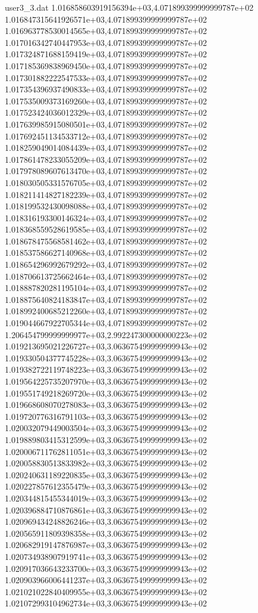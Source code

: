 \begin{filecontents}{user3_3.dat}
1.016858603919156394e+03,4.071899399999999787e+02
1.016847315641926571e+03,4.071899399999999787e+02
1.016963778530014565e+03,4.071899399999999787e+02
1.017016342740447953e+03,4.071899399999999787e+02
1.017324871688159419e+03,4.071899399999999787e+02
1.017185369838969450e+03,4.071899399999999787e+02
1.017301882222547533e+03,4.071899399999999787e+02
1.017354396937490833e+03,4.071899399999999787e+02
1.017535009373169260e+03,4.071899399999999787e+02
1.017523424036012329e+03,4.071899399999999787e+02
1.017639985915080501e+03,4.071899399999999787e+02
1.017692451134533712e+03,4.071899399999999787e+02
1.018259049014084439e+03,4.071899399999999787e+02
1.017861478233055209e+03,4.071899399999999787e+02
1.017978089607613470e+03,4.071899399999999787e+02
1.018030505331576705e+03,4.071899399999999787e+02
1.018211414827182239e+03,4.071899399999999787e+02
1.018199532430098088e+03,4.071899399999999787e+02
1.018316193300146324e+03,4.071899399999999787e+02
1.018368559528619585e+03,4.071899399999999787e+02
1.018678475568581462e+03,4.071899399999999787e+02
1.018537586627140968e+03,4.071899399999999787e+02
1.018654296992679292e+03,4.071899399999999787e+02
1.018706613725662464e+03,4.071899399999999787e+02
1.018887820281195104e+03,4.071899399999999787e+02
1.018875640824183847e+03,4.071899399999999787e+02
1.018992400685212260e+03,4.071899399999999787e+02
1.019044667922705344e+03,4.071899399999999787e+02
1.206454799999999977e+03,2.992247300000000223e+02
1.019213695021226727e+03,3.063675499999999943e+02
1.019330504377745228e+03,3.063675499999999943e+02
1.019382722119748223e+03,3.063675499999999943e+02
1.019564225735207970e+03,3.063675499999999943e+02
1.019551749218269720e+03,3.063675499999999943e+02
1.019668608070278083e+03,3.063675499999999943e+02
1.019720776316791103e+03,3.063675499999999943e+02
1.020032079449003504e+03,3.063675499999999943e+02
1.019889803415312599e+03,3.063675499999999943e+02
1.020006711762811051e+03,3.063675499999999943e+02
1.020058830513833982e+03,3.063675499999999943e+02
1.020240631189220835e+03,3.063675499999999943e+02
1.020227857612355479e+03,3.063675499999999943e+02
1.020344815455344019e+03,3.063675499999999943e+02
1.020396884710876861e+03,3.063675499999999943e+02
1.020969434248826246e+03,3.063675499999999943e+02
1.020565911809398358e+03,3.063675499999999943e+02
1.020682919147876987e+03,3.063675499999999943e+02
1.020734938907919741e+03,3.063675499999999943e+02
1.020917036643233700e+03,3.063675499999999943e+02
1.020903966006441237e+03,3.063675499999999943e+02
1.021021022840409955e+03,3.063675499999999943e+02
1.021072993104962734e+03,3.063675499999999943e+02

\end{filecontents}
